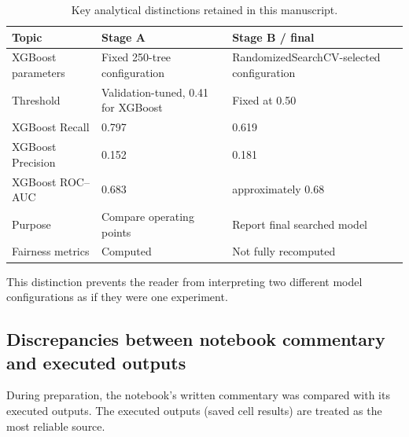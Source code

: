 \documentclass[10pt,a4paper]{article}
\begin{document}
\begin{table}[H]
\centering
\caption{Key analytical distinctions retained in this manuscript.}
\label{tab:audit}
\begin{tabularx}{\textwidth}{lYY}
\toprule
Topic & Stage A & Stage B / final\\
\midrule
XGBoost parameters & Fixed 250-tree configuration & RandomizedSearchCV-selected configuration\\
Threshold & Validation-tuned, 0.41 for XGBoost & Fixed at 0.50\\
XGBoost Recall & 0.797 & 0.619\\
XGBoost Precision & 0.152 & 0.181\\
XGBoost ROC--AUC & 0.683 & approximately 0.68\\
Purpose & Compare operating points & Report final searched model\\
Fairness metrics & Computed & Not fully recomputed\\
\bottomrule
\end{tabularx}
\end{table}

This distinction prevents the reader from interpreting two different model configurations as if they were one experiment.

\subsection*{Discrepancies between notebook commentary and executed outputs}

During preparation, the notebook's written commentary was compared with its executed outputs. The executed outputs (saved cell results) are treated as the most reliable source.
\end{document}
